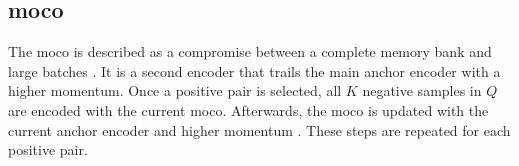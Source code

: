 \subsection{\acl{moco}}\label{subsec:MoCo}
The \ac{moco} is described as a compromise between a complete memory bank and large batches \citet{mochi_2020}.
It is a second encoder that trails the main anchor encoder with a higher momentum.
Once a positive pair is selected, all $K$ negative samples in $Q$ are encoded with the current \ac{moco}.
Afterwards, the \ac{moco} is updated with the current anchor encoder and higher momentum  \citet{mochi_2020,PCL_2021}. 
These steps are repeated for each positive pair.